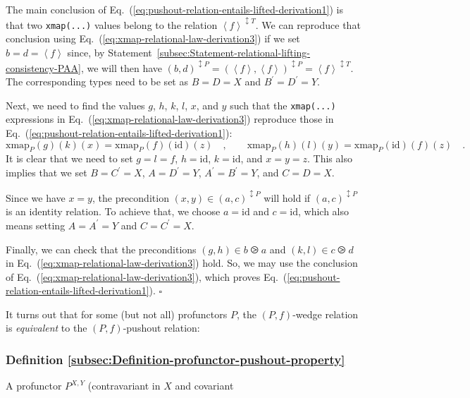 The main conclusion of Eq.~(\ref{eq:pushout-relation-entails-lifted-derivation1})
is that two \lstinline!xmap(...)! values belong to the relation $\left<f\right>^{\updownarrow T}$.
We can reproduce that conclusion using Eq.~(\ref{eq:xmap-relational-law-derivation3})
if we set $b=d=\left<f\right>$ since, by Statement~\ref{subsec:Statement-relational-lifting-consistency-PAA},
we will then have $(b,d)^{\updownarrow P}=(\left<f\right>,\left<f\right>)^{\updownarrow P}=\left<f\right>^{\updownarrow T}$.
The corresponding types need to be set as $B=D=X$ and $B^{\prime}=D^{\prime}=Y$.

Next, we need to find the values $g$, $h$, $k$, $l$, $x$, and
$y$ such that the \lstinline!xmap(...)! expressions in Eq.~(\ref{eq:xmap-relational-law-derivation3})
reproduce those in Eq.~(\ref{eq:pushout-relation-entails-lifted-derivation1}):
\[
\text{xmap}_{P}(g)(k)(x)=\text{xmap}_{P}(f)(\text{id})(z)\quad,\quad\quad\text{xmap}_{P}(h)(l)(y)=\text{xmap}_{P}(\text{id})(f)(z)\quad.
\]
It is clear that we need to set $g=l=f$, $h=\text{id}$, $k=\text{id}$,
and $x=y=z$. This also implies that we set $B=C^{\prime}=X$, $A=D^{\prime}=Y$,
$A^{\prime}=B^{\prime}=Y$, and $C=D=X$.

Since we have $x=y$, the precondition $(x,y)\in(a,c)^{\updownarrow P}$
will hold if $(a,c)^{\updownarrow P}$ is an identity relation. To
achieve that, we choose $a=\text{id}$ and $c=\text{id}$, which also
means setting $A=A^{\prime}=Y$ and $C=C^{\prime}=X$. 

Finally, we can check that the preconditions $(g,h)\in b\ogreaterthan a$
and $(k,l)\in c\ogreaterthan d$ in Eq.~(\ref{eq:xmap-relational-law-derivation3})
hold. So, we may use the conclusion of Eq.~(\ref{eq:xmap-relational-law-derivation3}),
which proves Eq.~(\ref{eq:pushout-relation-entails-lifted-derivation1}).
$\square$

It turns out that for some (but not all) profunctors $P$, the $\left(P,f\right)$-wedge
relation is \emph{equivalent} to the $\left(P,f\right)$-pushout relation:

\subsubsection{Definition \label{subsec:Definition-profunctor-pushout-property}\ref{subsec:Definition-profunctor-pushout-property}}

A profunctor $P^{X,Y}$ (contravariant in $X$ and covariant%
\begin{comment}
empty arrow
\end{comment}

